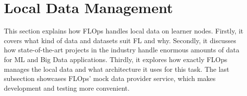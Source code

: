 \section{Local Data Management}

This section explains how FLOps handles local data on learner nodes.
Firstly, it covers what kind of data and datasets suit FL and why.
Secondly, it discusses how state-of-the-art projects in the industry handle enormous amounts of data for ML and Big Data applications.
Thirdly, it explores how exactly FLOps manages the local data and what architecture it uses for this task.
The last subsection showcases FLOps' mock data provider service, which makes development and testing more convenient.








